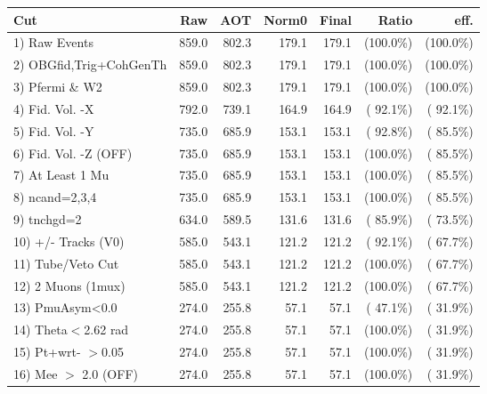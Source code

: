 \begin{table}[h!]\centering
 \begin{tabular}{||l||r|r|r|r|r|r||}
 \hline
 \hline
 Cut & Raw & AOT & Norm0 & Final & Ratio & eff.       \\
 \hline
  1) Raw Events           &        859.0 &        802.3 &        179.1 &        179.1 & (100.0\%) & (100.0\%) \\
  2) OBGfid,Trig+CohGenTh &        859.0 &        802.3 &        179.1 &        179.1 & (100.0\%) & (100.0\%) \\
  3) Pfermi \& W2         &        859.0 &        802.3 &        179.1 &        179.1 & (100.0\%) & (100.0\%) \\
  4) Fid. Vol. -X         &        792.0 &        739.1 &        164.9 &        164.9 & ( 92.1\%) & ( 92.1\%) \\
  5) Fid. Vol. -Y         &        735.0 &        685.9 &        153.1 &        153.1 & ( 92.8\%) & ( 85.5\%) \\
  6) Fid. Vol. -Z (OFF)   &        735.0 &        685.9 &        153.1 &        153.1 & (100.0\%) & ( 85.5\%) \\
  7) At Least 1 Mu        &        735.0 &        685.9 &        153.1 &        153.1 & (100.0\%) & ( 85.5\%) \\
  8) ncand=2,3,4          &        735.0 &        685.9 &        153.1 &        153.1 & (100.0\%) & ( 85.5\%) \\
  9) tnchgd=2             &        634.0 &        589.5 &        131.6 &        131.6 & ( 85.9\%) & ( 73.5\%) \\
 10) +/- Tracks (V0)      &        585.0 &        543.1 &        121.2 &        121.2 & ( 92.1\%) & ( 67.7\%) \\
 11) Tube/Veto Cut        &        585.0 &        543.1 &        121.2 &        121.2 & (100.0\%) & ( 67.7\%) \\
 12) 2 Muons (1mux)       &        585.0 &        543.1 &        121.2 &        121.2 & (100.0\%) & ( 67.7\%) \\
 13) PmuAsym<0.0          &        274.0 &        255.8 &         57.1 &         57.1 & ( 47.1\%) & ( 31.9\%) \\
 14) Theta$<$2.62 rad     &        274.0 &        255.8 &         57.1 &         57.1 & (100.0\%) & ( 31.9\%) \\
 15) Pt+wrt- $>$0.05      &        274.0 &        255.8 &         57.1 &         57.1 & (100.0\%) & ( 31.9\%) \\
 16) Mee $>$ 2.0  (OFF)   &        274.0 &        255.8 &         57.1 &         57.1 & (100.0\%) & ( 31.9\%) \\

\end{tabular}
\end{table}
